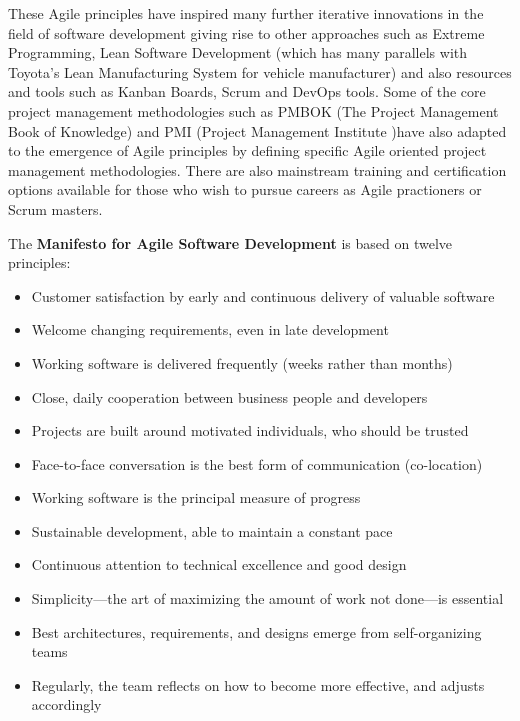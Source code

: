 \documentclass[a4paper,12pt]{article}
\begin{document}
\begin{samepage}
\begin{samepage}
These Agile principles have inspired many further iterative innovations in the field of software development giving rise to other approaches such as Extreme Programming, Lean Software Development (which has many parallels with Toyota's Lean Manufacturing System for vehicle manufacturer) and also resources and tools such as Kanban Boards, Scrum and DevOps tools. Some of the core project management methodologies such as PMBOK (The Project Management Book of Knowledge) and PMI (Project Management Institute )have also adapted to the emergence of Agile principles by defining specific Agile oriented project management methodologies. There are also mainstream training and certification options available for those who wish to pursue careers as Agile practioners or Scrum masters.



The \textbf{Manifesto for Agile Software Development} is based on twelve principles:
\begin{itemize}
\item Customer satisfaction by early and continuous delivery of valuable software
\item Welcome changing requirements, even in late development
\item Working software is delivered frequently (weeks rather than months)
\item Close, daily cooperation between business people and developers
\item Projects are built around motivated individuals, who should be trusted
\item Face-to-face conversation is the best form of communication (co-location)
\item Working software is the principal measure of progress
\item Sustainable development, able to maintain a constant pace
\item Continuous attention to technical excellence and good design
\item Simplicity—the art of maximizing the amount of work not done—is essential
\item Best architectures, requirements, and designs emerge from self-organizing teams
\item Regularly, the team reflects on how to become more effective, and adjusts accordingly
\end{itemize}
\end{samepage}
\begin{samepage}
\newpage

\end{samepage}
\end{samepage}
\end{document}
